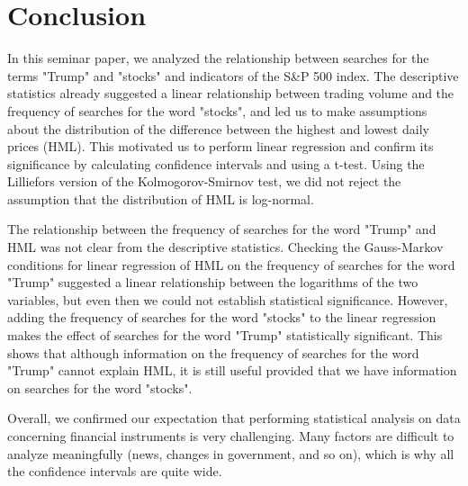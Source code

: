 \documentclass[../main.tex]{subfiles}
\begin{document}
\newpage
\section{Conclusion}



In this seminar paper, we analyzed the relationship between searches for the terms "Trump" and "stocks" and indicators of the S\&P 500 index.
The descriptive statistics already suggested a linear relationship between trading volume and the frequency of searches for the word "stocks", and led us to make assumptions about the distribution of the difference between the highest and lowest daily prices (HML).
This motivated us to perform linear regression and confirm its significance by calculating confidence intervals and using a t-test.
Using the Lilliefors version of the Kolmogorov-Smirnov test, we did not reject the assumption that the distribution of HML is log-normal.

The relationship between the frequency of searches for the word "Trump" and HML was not clear from the descriptive statistics.
Checking the Gauss-Markov conditions for linear regression of HML on the frequency of searches for the word "Trump" suggested a linear relationship between the logarithms of the two variables, but even then we could not establish statistical significance.
However, adding the frequency of searches for the word "stocks" to the linear regression makes the effect of searches for the word "Trump" statistically significant.
This shows that although information on the frequency of searches for the word "Trump" cannot explain HML, it is still useful provided that we have information on searches for the word "stocks".

Overall, we confirmed our expectation that performing statistical analysis on data concerning financial instruments is very challenging. Many factors are difficult to analyze meaningfully (news, changes in government, and so on), which is why all the confidence intervals are quite wide.
\end{document}
